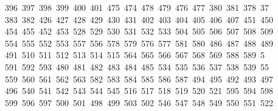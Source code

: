 \begin{tabbing}
\ 396\ 397\ 398\ 399\ 400\ 401\ 475\ 474\ 478\ 479\ 476\ 477\ 380\ 381\ 378\ 37\\[0pt]
\ 383\ 382\ 426\ 427\ 428\ 429\ 430\ 431\ 402\ 403\ 404\ 405\ 406\ 407\ 451\ 450\\[0pt]
\>\ 454\ 455\ 452\ 453\ 528\ 529\ 530\ 531\ 532\ 533\ 504\ 505\ 506\ 507\ 508\ 509\\[0pt]
\>\ 554\ 555\ 552\ 553\ 557\ 556\ 578\ 579\ 576\ 577\ 581\ 580\ 486\ 487\ 488\ 489\ \\[0pt]
\ 491\ 510\ 511\ 512\ 513\ 514\ 515\ 564\ 565\ 566\ 567\ 568\ 569\ 588\ 589\ 5\\[0pt]
\ 591\ 592\ 593\ 480\ 481\ 482\ 483\ 484\ 485\ 534\ 535\ 536\ 537\ 538\ 539\ 55\\[0pt]
\ 559\ 560\ 561\ 562\ 563\ 582\ 583\ 584\ 585\ 586\ 587\ 494\ 495\ 492\ 493\ 497\\[0pt]
\>\ 496\ 540\ 541\ 542\ 543\ 544\ 545\ 516\ 517\ 518\ 519\ 520\ 521\ 595\ 594\ 598\\[0pt]
\>\ 599\ 596\ 597\ 500\ 501\ 498\ 499\ 503\ 502\ 546\ 547\ 548\ 549\ 550\ 551\ 522\ \\[0pt]

\end{tabbing}
